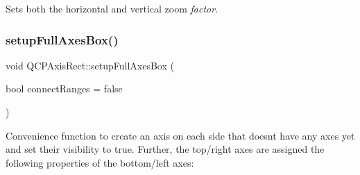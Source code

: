 Sets both the horizontal and vertical zoom {\itshape factor}. \hypertarget{class_q_c_p_axis_rect_a5fa906175447b14206954f77fc7f1ef4}{}\label{class_q_c_p_axis_rect_a5fa906175447b14206954f77fc7f1ef4} 
\subsubsection{\texorpdfstring{setup\+Full\+Axes\+Box()}{setupFullAxesBox()}}
{\footnotesize\ttfamily void Q\+C\+P\+Axis\+Rect\+::setup\+Full\+Axes\+Box (\begin{DoxyParamCaption}\item[{bool}]{connect\+Ranges = {\ttfamily false} }\end{DoxyParamCaption})}

Convenience function to create an axis on each side that doesn\textquotesingle{}t have any axes yet and set their visibility to true. Further, the top/right axes are assigned the following properties of the bottom/left axes\+:

